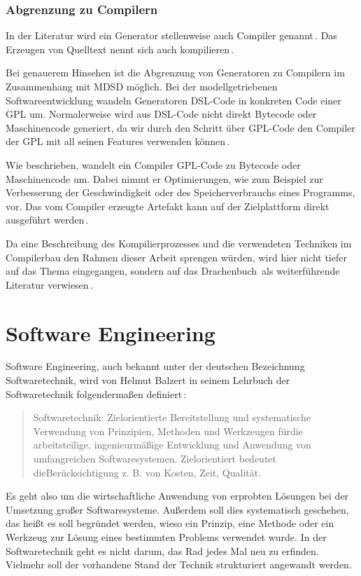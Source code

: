 \documentclass[12pt,oneside,a4paper,parskip]{scrbook}
\begin{document}
\subsubsection{Abgrenzung zu Compilern}

In der Literatur wird ein Generator stellenweise auch Compiler genannt\,\cite[S.\,26]{voelter2013}. Das Erzeugen von Quelltext nennt sich auch kompilieren\,\cite[S.\,19]{fowler2010}.

Bei genauerem Hinsehen ist die Abgrenzung von Generatoren zu Compilern im Zusammenhang mit MDSD möglich. Bei der modellgetriebenen Softwareentwicklung wandeln Generatoren DSL-Code in konkreten Code einer GPL um. Normalerweise wird aus DSL-Code nicht direkt Bytecode oder Maschinencode generiert, da wir durch den Schritt über GPL-Code den Compiler der GPL mit all seinen Features verwenden können\,\cite[S.\,11]{voelter2013}.

Wie beschrieben, wandelt ein Compiler GPL-Code zu Bytecode oder Maschinencode um. Dabei nimmt er Optimierungen, wie zum Beispiel zur Verbesserung der Geschwindigkeit oder des Speicherverbrauchs eines Programms, vor. Das vom Compiler erzeugte Artefakt kann auf der Zielplattform direkt ausgeführt werden\,\cite[S.\,345ff.]{czaeis2000}.

Da eine Beschreibung des Kompilierprozesses und die verwendeten Techniken im Compilerbau den Rahmen dieser Arbeit sprengen würden, wird hier nicht tiefer auf das Thema eingegangen, sondern auf das \glqq Drachenbuch\grqq\ als weiterführende Literatur verwiesen\,\cite{aho2006}.

\section{Software Engineering}

Software Engineering, auch bekannt unter der deutschen Bezeichnung Softwaretechnik, wird von Helmut Balzert in seinem Lehrbuch der Softwaretechnik folgendermaßen definiert\,\cite[S.17]{balzert2009a}:

\begin{quote}
\glqq Softwaretechnik: Zielorientierte Bereitstellung und systematische Verwendung von Prinzipien, Methoden und Werkzeugen fürdie arbeitsteilige, ingenieurmäßige Entwicklung und Anwendung von umfangreichen Softwaresystemen. Zielorientiert bedeutet dieBerücksichtigung z. B. von Kosten, Zeit, Qualität.\grqq
\end{quote}

Es geht also um die wirtschaftliche Anwendung von erprobten Lösungen bei der Umsetzung großer Softwaresysteme. Außerdem soll dies systematisch geschehen, das heißt es soll begründet werden, wieso ein Prinzip, eine Methode oder ein Werkzeug zur Lösung eines bestimmten Problems verwendet wurde. In der Softwaretechnik geht es nicht darum, das Rad jedes Mal neu zu erfinden. Vielmehr soll der vorhandene Stand der Technik strukturiert angewandt werden.
\end{document}
